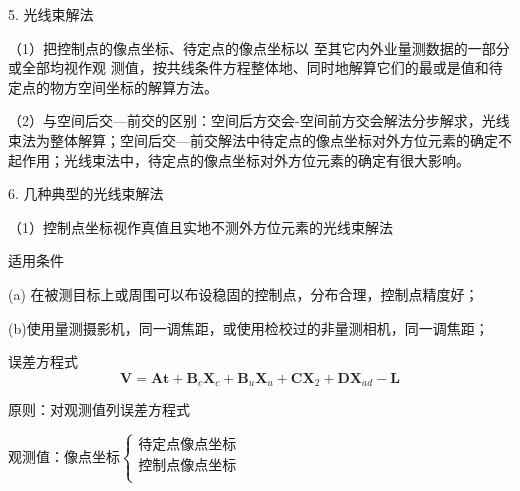 \documentclass[a4paper]{ctexart}
\begin{document}
\begin{figure}[htbp]
%
\end{figure}

5. 光线束解法

（1）把控制点的像点坐标、待定点的像点坐标以 至其它内外业量测数据的一部分或全部均视作观 测值，按共线条件方程整体地、同时地解算它们的最或是值和待定点的物方空间坐标的解算方法。

（2）与空间后交—前交的区别：空间后方交会-空间前方交会解法分步解求，光线束法为整体解算；空间后交—前交解法中待定点的像点坐标对外方位元素的确定不起作用；光线束法中，待定点的像点坐标对外方位元素的确定有很大影响。

6. 几种典型的光线束解法

（1）控制点坐标视作真值且实地不测外方位元素的光线束解法

 适用条件

(a) 在被测目标上或周围可以布设稳固的控制点，分布合理，控制点精度好；

(b)使用量测摄影机，同一调焦距，或使用检校过的非量测相机，同一调焦距；

误差方程式
$$
\boldsymbol{V}=\boldsymbol{At}+\boldsymbol{B}_c\boldsymbol{X}_c+\boldsymbol{B}_u\boldsymbol{X}_u+\boldsymbol{CX}_2+\boldsymbol{DX}_{ad}-\boldsymbol{L}
$$

原则：对观测值列误差方程式

观测值：$\text{像点坐标}\begin{cases}
	\text{待定点像点坐标}\\
	\text{控制点像点坐标}\\
\end{cases}$
\end{document}
